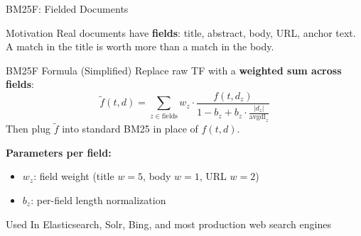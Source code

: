 \documentclass[aspectratio=169]{beamer}
\begin{document}
\begin{frame}[shrink=5]{BM25F: Fielded Documents}
\begin{block}{Motivation}
Real documents have \textbf{fields}: title, abstract, body, URL, anchor text. \\
A match in the title is worth more than a match in the body.
\end{block}

\vspace{0.5em}

\begin{block}{BM25F Formula (Simplified)}
Replace raw TF with a \textbf{weighted sum across fields}:
$$\tilde{f}(t, d) = \sum_{z \in \text{fields}} w_z \cdot \frac{f(t, d_z)}{1 - b_z + b_z \cdot \frac{|d_z|}{\text{avgdl}_z}}$$
Then plug $\tilde{f}$ into standard BM25 in place of $f(t,d)$.
\end{block}

\vspace{0.5em}

\textbf{Parameters per field:}
\begin{itemize}
    \item $w_z$: field weight (title $w = 5$, body $w = 1$, URL $w = 2$)
    \item $b_z$: per-field length normalization
\end{itemize}

\vspace{0.5em}

\begin{exampleblock}{Used In}
Elasticsearch, Solr, Bing, and most production web search engines
\end{exampleblock}
\end{frame}
\end{document}
